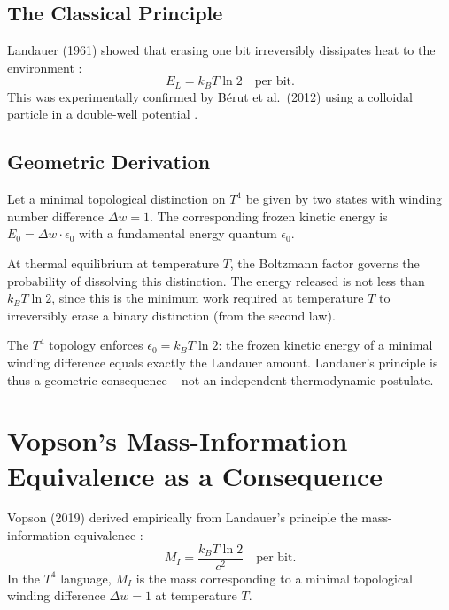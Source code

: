 \subsection{The Classical Principle}

Landauer (1961) showed that erasing one bit irreversibly dissipates
heat to the environment \cite{Landauer1961}:
\begin{equation}
  E_L = k_B T \ln 2 \quad \text{per bit.}
  \label{eq:landauer}
\end{equation}
This was experimentally confirmed by Bérut et al.\ (2012)
using a colloidal particle in a double-well potential \cite{Berut2012}.

\subsection{Geometric Derivation}

Let a minimal topological distinction on \(T^4\) be given by two
states with winding number difference \(\Delta w = 1\).
The corresponding frozen kinetic energy is
\(E_0 = \Delta w \cdot \epsilon_0\) with a fundamental energy
quantum \(\epsilon_0\).

At thermal equilibrium at temperature \(T\), the Boltzmann factor
governs the probability of dissolving this distinction.
The energy released is not less than \(k_B T \ln 2\),
since this is the minimum work required at temperature \(T\)
to irreversibly erase a binary distinction (from the second law).

The \(T^4\) topology enforces \(\epsilon_0 = k_B T \ln 2\):
the frozen kinetic energy of a minimal winding difference equals
exactly the Landauer amount.
Landauer's principle is thus a geometric consequence --
not an independent thermodynamic postulate.

\section{Vopson's Mass-Information Equivalence as a Consequence}

Vopson (2019) derived empirically from Landauer's principle
the mass-information equivalence \cite{Vopson2019}:
\begin{equation}
  M_I = \frac{k_B T \ln 2}{c^2} \quad \text{per bit.}
  \label{eq:vopson}
\end{equation}
In the \(T^4\) language, \(M_I\) is the mass corresponding to
a minimal topological winding difference \(\Delta w = 1\)
at temperature \(T\).


